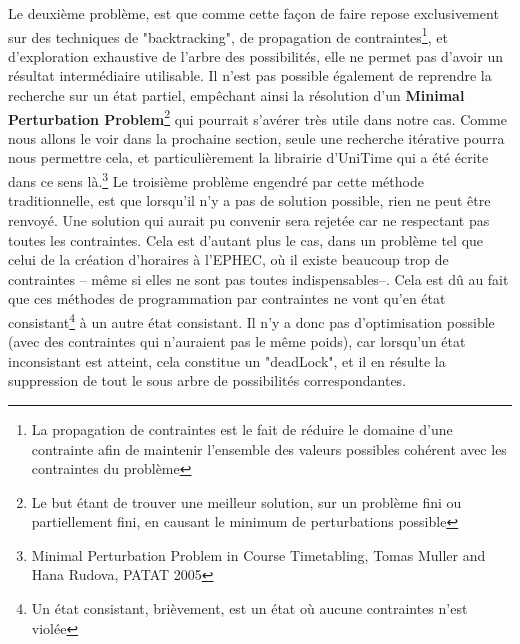 \indent
Le deuxième problème, est que comme cette façon de faire repose exclusivement sur des techniques de "backtracking", de propagation de contraintes\footnote{La propagation de contraintes est le fait de réduire le domaine d'une contrainte afin de maintenir l'ensemble des valeurs possibles cohérent avec les contraintes du problème},
et d'exploration exhaustive de l'arbre des possibilités, elle  ne permet pas d'avoir un résultat intermédiaire utilisable.  
Il n'est pas possible également de reprendre la recherche sur un état partiel, empêchant ainsi la résolution d'un \textbf{Minimal Perturbation Problem}\footnote{Le but étant de trouver une meilleur solution, sur un problème fini ou partiellement fini, en causant le minimum de perturbations possible} qui pourrait s'avérer très utile dans notre cas. \newline
Comme nous allons le voir dans la prochaine section, seule une recherche itérative pourra nous permettre cela, et particulièrement la librairie d'UniTime qui a été écrite dans ce sens là.\footnote{Minimal Perturbation Problem in Course Timetabling, Tomas Muller and Hana Rudova, PATAT 2005 }
\newline
\indent
Le troisième problème engendré par cette méthode traditionnelle, est que lorsqu'il n'y a pas de solution possible, rien ne peut être renvoyé.  Une solution qui aurait pu convenir sera rejetée car ne respectant pas toutes les contraintes. Cela est d'autant plus le cas, dans un problème tel que 
celui de la création d'horaires à l'EPHEC, où il existe beaucoup trop de contraintes -- même si elles ne sont pas toutes indispensables--.  Cela est dû au fait que ces méthodes de programmation par contraintes ne vont qu'en état consistant\footnote{Un état consistant, brièvement, est un état où aucune contraintes n'est violée} à un autre état consistant. Il n'y a donc pas d'optimisation possible (avec des contraintes qui n'auraient pas le même poids), car lorsqu'un état inconsistant est atteint, cela constitue un "deadLock", et il en résulte la suppression de tout le sous arbre de possibilités correspondantes.\newline
